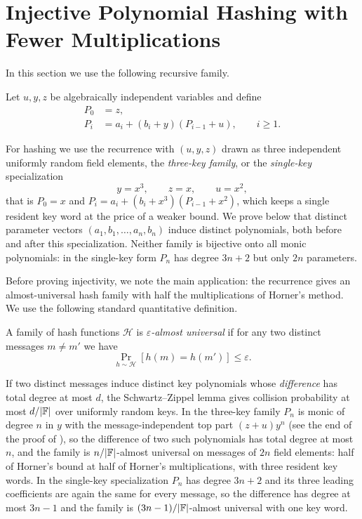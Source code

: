 

\section{Injective Polynomial Hashing with Fewer Multiplications}
\label{sec:injective}

In this section we use the following recursive family.
\begin{definition}\label{def:injective:recurrence}
Let $u,y,z$ be algebraically independent variables and define
\begin{align}
   P_0 &= z, \\
   P_i &= a_i+(b_i+y)(P_{i-1}+u),
   \qquad i\ge1. \label{eq:injective-recurrence}
\end{align}
\end{definition}
For hashing we use the recurrence with $(u,y,z)$ drawn as three independent
uniformly random field elements, the \emph{three-key family}, or the
\emph{single-key} specialization
\begin{equation}\label{eq:injective-single-key}
   y=x^3,\qquad z=x,\qquad u=x^2,
\end{equation}
that is $P_0=x$ and $P_i=a_i+(b_i+x^3)(P_{i-1}+x^2)$, which keeps a single
resident key word at the price of a weaker bound.
We prove below that distinct parameter vectors
$(a_1,b_1,\dots,a_n,b_n)$ induce distinct polynomials, both before and after
this specialization.  Neither family is bijective onto all monic
polynomials: in the single-key form $P_n$ has degree $3n+2$ but only $2n$
parameters.


\vspace{.5em}

Before proving injectivity, we note the main application: the recurrence gives an almost-universal hash family with half the multiplications of Horner's method.
We use the following standard quantitative definition.
\begin{definition}\label{def:injective:universal}
   A family of hash functions $\mathcal H$ is \emph{$\varepsilon$-almost universal} if for any two distinct messages $m\ne m'$ we have
   \[
      \Pr_{h\sim\mathcal H}\!\left[h(m)=h(m')\right] \le \varepsilon.
   \]
\end{definition}

If two distinct messages induce distinct key polynomials whose \emph{difference} has total degree at most $d$, the Schwartz--Zippel lemma gives collision probability at most $d/|\mathbb{F}|$ over uniformly random keys.
In the three-key family $P_n$ is monic of degree $n$ in $y$ with the message-independent top part $(z+u)y^n$ (see the end of the proof of ), so the difference of two such polynomials has total degree at most $n$, and the family is $n/|\mathbb{F}|$-almost universal on messages of $2n$ field elements: half of Horner's bound at half of Horner's multiplications, with three resident key words.
In the single-key specialization $P_n$ has degree $3n+2$ and its three leading coefficients are again the same for every message, so the difference has degree at most $3n-1$ and the family is $(3n-1)/|\mathbb{F}|$-almost universal with one key word.


